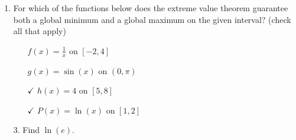 \documentclass[11pt]{article}
\begin{document}
\pagestyle{empty}
\newsavebox{\quizfront}
\begin{lrbox}{\quizfront}
\begin{minipage}[top][4.5in][t]{\textwidth} \setlength{\parindent}{1.5em}
\drawtitle
\vspace{-0.5in}
\begin{enumerate}

\item For which of the functions below does the extreme value theorem
guarantee both a global minimum and a global maximum on the given interval?
(check all that apply)

\vfill

\begin{enumerate}
  \item[\textbigcircle] $f(x)=\frac{1}{x}$ on $[-2,4]$
  \item[\textbigcircle] $g(x)=\sin(x)$ on $(0,\pi)$
  \item[\textcircled{{\color{blue}$\checkmark$}}] $h(x)=4$ on $[5,8]$
  \item[\textcircled{{\color{blue}$\checkmark$}}] $P(x)=\ln(x)$ on $[1,2]$
\end{enumerate}
  \vfill


\end{enumerate}



\end{minipage}
\end{lrbox}

\newsavebox{\quizback}
\begin{lrbox}{\quizback}
\begin{minipage}[top][4.5in][t]{\textwidth} \setlength{\parindent}{1.5em}
\begin{itemize}
 \item[3.] Find $\ln(e)$. 


\end{itemize}
\end{minipage}
\end{lrbox}

\noindent \usebox{\quizfront}
\vfill

\end{document}
